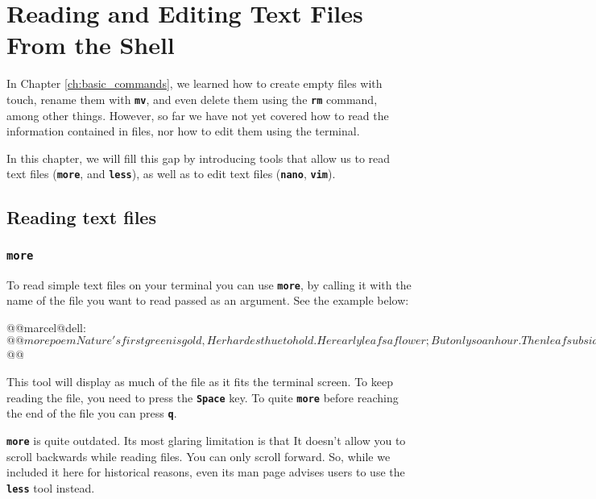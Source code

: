 \chapter{Reading and Editing Text Files From the Shell}\label{ch:reading_editing}

In Chapter \ref{ch:basic_commands}, we learned how to create empty files with touch, rename them with \textbf{\texttt{mv}}, and even delete them using the \textbf{\texttt{rm}} command, among other things. However, so far we have not yet covered how to read the information contained in files, nor how to edit them using the terminal.

In this chapter, we will fill this gap by introducing tools that allow us to read text files (\textbf{\texttt{more}}, and \textbf{\texttt{less}}), as well as to edit text files (\textbf{\texttt{nano}}, \textbf{\texttt{vim}}).

\section{Reading text files}

\subsection{\textbf{\texttt{more}}}

To read simple text files on your terminal you can use \textbf{\texttt{more}}, by calling it with the name of the file you want to read passed as an argument. See the example below:
\begin{command_line}[Bash]
@@marcel@dell:~$@@ more poem
Nature's first green is gold,
Her hardest hue to hold.
Her early leafs a flower;
But only so an hour.
Then leaf subsides to leaf.
So Eden sank to grief,
So dawn goes down to day.
Nothing gold can stay.

@@marcel@dell:~$@@
\end{command_line}

This tool will display as much of the file as it fits the terminal screen. To keep reading the file, you need to press the \textbf{\texttt{Space}} key. To quite \textbf{\texttt{more}} before reaching the end of the file you can press \textbf{\texttt{q}}.

\textbf{\texttt{more}} is quite outdated. Its most glaring limitation is that  It doesn't allow you to scroll backwards while reading files. You can only scroll forward. So, while we included it here for historical reasons, even its man page advises users to use the \textbf{\texttt{less}} tool instead.

